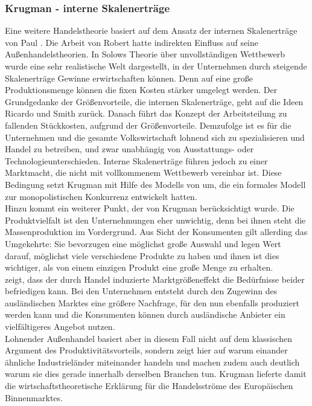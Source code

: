 \subsubsection*{Krugman - interne Skalenerträge}
Eine weitere Handelstheorie basiert auf dem Ansatz der internen Skalenerträge von Paul \cite{Krugman.79}. Die Arbeit von Robert \cite{Solow.1956} hatte indirekten Einfluss auf seine Außenhandelstheorien. In Solows Theorie über unvollständigen Wettbewerb wurde eine sehr realistische Welt dargestellt, in der Unternehmen durch steigende Skalenerträge Gewinne erwirtschaften können. Denn auf eine große Produktionsmenge können die fixen Kosten stärker umgelegt werden. 
Der Grundgedanke der Größenvorteile, die internen Skalenerträge, geht auf die Ideen Ricardo und Smith zurück. Danach führt das Konzept der Arbeitsteilung zu fallenden Stückkosten, aufgrund der Größenvorteile. Demzufolge ist es für die Unternehmen und die gesamte Volkswirtschaft lohnend sich zu spezialisieren und Handel zu betreiben, und zwar unabhängig von Ausstattungs- oder Technologieunterschieden. Interne Skalen\-erträge führen jedoch zu einer Marktmacht, die nicht mit vollkommenem Wettbewerb vereinbar ist. Diese Bedingung setzt Krugman mit Hilfe des Modells von \cite{Dixit.1977} um, die ein formales Modell zur monopolistischen Konkurrenz entwickelt hatten.\\
%
Hinzu kommt ein weiterer Punkt, der von Krugman berücksichtigt wurde. Die Produktvielfalt ist den Unternehmungen eher unwichtig, denn bei ihnen steht die Massenproduktion im Vordergrund. Aus Sicht der Konsumenten gilt allerding das Umgekehrte: Sie bevorzugen eine möglichst große Auswahl und legen Wert darauf, möglichst viele verschiedene Produkte zu haben und ihnen ist dies wichtiger, als von einem einzigen Produkt eine große Menge zu erhalten.\\
%
\cite{Krugman.79} zeigt, dass der durch Handel induzierte Marktgrößeneffekt die Bedürfnisse beider befriedigen kann. Bei den Unternehmen entsteht durch den Zugewinn des ausländischen Marktes eine größere Nachfrage, für den nun ebenfalls produziert werden kann und die Konsumenten können durch ausländische Anbieter ein vielfältigeres Angebot nutzen. \\
%
Lohnender Außenhandel basiert aber in diesem Fall nicht auf dem klassischen Argument des Produktivitätsvorteils, sondern zeigt hier auf warum einander ähnliche Industrieländer miteinander handeln und machen zudem auch deutlich warum sie dies  gerade innerhalb derselben Branchen tun. Krugman lieferte damit die wirtschaftstheoretische Erklärung für die Handelsströme des Europäischen Binnenmarktes.\\
